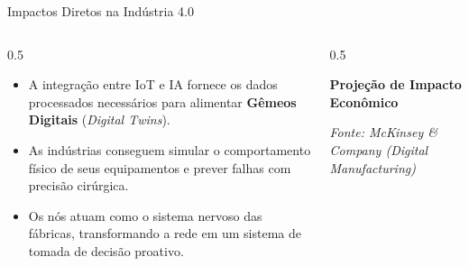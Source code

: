 \begin{frame}{Impactos Diretos na Indústria 4.0}
    \begin{columns}
        \begin{column}{0.5\textwidth}
            \begin{itemize}
                \item A integração entre IoT e IA fornece os dados processados necessários para alimentar \textbf{Gêmeos Digitais} (\textit{Digital Twins}).  
                \item As indústrias conseguem simular o comportamento físico de seus equipamentos e prever falhas com precisão cirúrgica.  
                \item Os nós atuam como o sistema nervoso das fábricas, transformando a rede em um sistema de tomada de decisão proativo.  
            \end{itemize}
        \end{column}
        
        \begin{column}{0.5\textwidth}
            \begin{center}
                \textbf{Projeção de Impacto Econômico}\vspace{0.4cm}
                
                
                \vspace{0.6cm}
                {\tiny \textit{Fonte: McKinsey \& Company (Digital Manufacturing)}}
            \end{center}
        \end{column}
    \end{columns}
\end{frame}